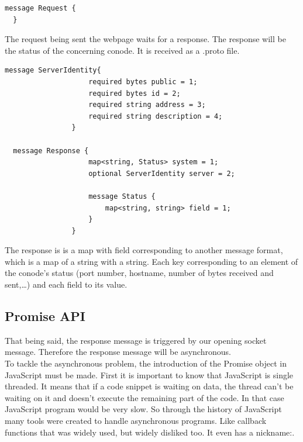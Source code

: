 \documentclass[11pt, a4paper, twoside, openright]{book} %
\begin{document}
\begin{lstlisting}[caption={empty .proto file}, captionpos=b]
  message Request {
  }
\end{lstlisting}

The request being sent the webpage waits for a response. The response will be the
status of the concerning conode. It is received as a .proto file.

\begin{lstlisting}[caption={response .proto file}, captionpos=b]
  message ServerIdentity{
    				required bytes public = 1;
    				required bytes id = 2;
    				required string address = 3;
    				required string description = 4;
				}

  message Response {
    				map<string, Status> system = 1;
    				optional ServerIdentity server = 2;

				    message Status {
        				map<string, string> field = 1;
    				}
				}
\end{lstlisting}

The response is is a map with field corresponding to another message format, which
is a map of a string with a string. Each key corresponding to an element of the conode's
status (port number, hostname, number of bytes received and sent,\ldots) and each field
to its value.\\
\subsection{Promise API}
That being said, the response message is triggered by our opening socket message. Therefore the
response message will be asynchronous.\\
To tackle the asynchronous problem, the introduction of the Promise object in JavaScript must be
made. First it is important to know that JavaScript is single threaded. It means
that if a code snippet is waiting on data, the thread can't be waiting on it and doesn't execute
the remaining part of the code. In that case JavaScript program would be very slow.
So through the history of JavaScript many tools were created to handle asynchronous programs.
Like callback functions that was widely used, but widely disliked too. It even has a nickname:.\\
\end{document}
